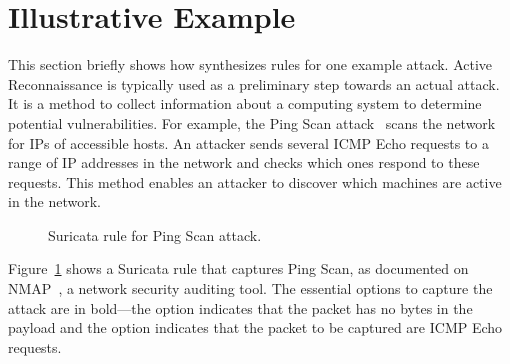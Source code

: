 \documentclass[conference]{IEEEtran}
\begin{document}





\section{Illustrative Example}
\label{sec:suri-metas-coverage}
\label{sec:active-recon}

This section briefly shows how \tname{} synthesizes rules for one
example attack. Active Reconnaissance is typically used as a
preliminary step towards an actual attack. It is a method to collect
information about a computing system to determine potential
vulnerabilities. For example, the Ping Scan attack~\cite{ping-scan}
scans the network for IPs of accessible hosts. An attacker sends
several ICMP Echo requests to a range of IP addresses in the network
and checks which ones respond to these requests. This method enables
an attacker to discover which machines are active in the network.

\begin{figure}[h!]
  
  \vspace{-1ex}  
  \caption{Suricata rule for Ping Scan attack.}
  \vspace{-2ex}  
  \label{fig:pingscan-example}
\end{figure}

Figure~\ref{fig:pingscan-example}  shows a Suricata rule that captures
Ping Scan, as documented on NMAP~\cite{netmap}, a network security
auditing tool. The essential options to capture the attack are in
bold---the option  indicates that the packet has no
bytes in the payload and the option  indicates that
the packet to be captured are ICMP Echo requests.
\end{document}
